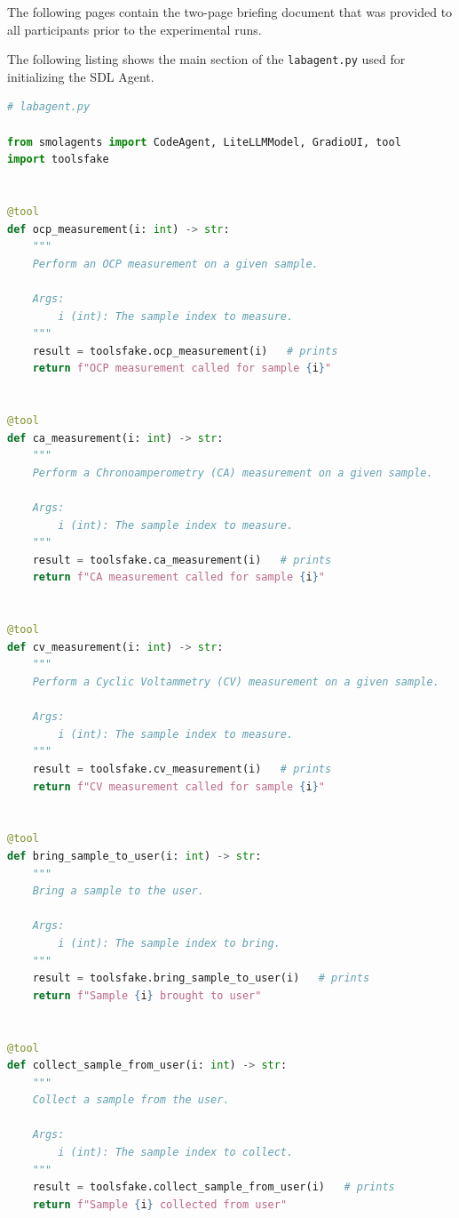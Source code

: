 \begin{anhang}


The following pages contain the two-page briefing document that was provided to all participants prior to the experimental runs.

{
\makeatletter
\@twosidefalse
\makeatother

}
\newpage
{}
The following listing shows the main section of the \texttt{labagent.py} used for initializing the SDL Agent.

\begin{lstlisting}[language=Python, caption={sdlagent.py}]
# labagent.py

from smolagents import CodeAgent, LiteLLMModel, GradioUI, tool
import toolsfake


@tool
def ocp_measurement(i: int) -> str:
    """
    Perform an OCP measurement on a given sample.

    Args:
        i (int): The sample index to measure.
    """
    result = toolsfake.ocp_measurement(i)   # prints
    return f"OCP measurement called for sample {i}"


@tool
def ca_measurement(i: int) -> str:
    """
    Perform a Chronoamperometry (CA) measurement on a given sample.

    Args:
        i (int): The sample index to measure.
    """
    result = toolsfake.ca_measurement(i)   # prints
    return f"CA measurement called for sample {i}"


@tool
def cv_measurement(i: int) -> str:
    """
    Perform a Cyclic Voltammetry (CV) measurement on a given sample.

    Args:
        i (int): The sample index to measure.
    """
    result = toolsfake.cv_measurement(i)   # prints
    return f"CV measurement called for sample {i}"


@tool
def bring_sample_to_user(i: int) -> str:
    """
    Bring a sample to the user.

    Args:
        i (int): The sample index to bring.
    """
    result = toolsfake.bring_sample_to_user(i)   # prints
    return f"Sample {i} brought to user"


@tool
def collect_sample_from_user(i: int) -> str:
    """
    Collect a sample from the user.

    Args:
        i (int): The sample index to collect.
    """
    result = toolsfake.collect_sample_from_user(i)   # prints
    return f"Sample {i} collected from user"



\end{lstlisting}
\end{anhang}

